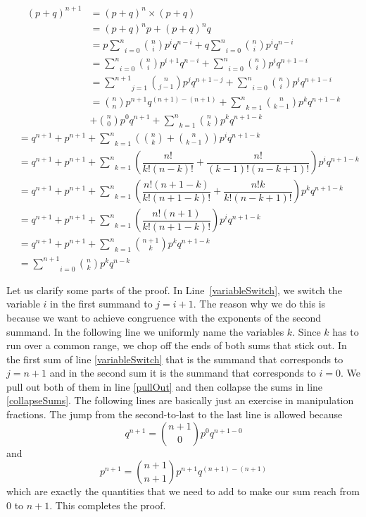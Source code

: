 \documentclass[a4paper,11pt,leqno]{report}
\begin{document}
\begin{align}
(p + q)^{n+1} &= (p + q)^{n} \times (p + q) \\
&= (p+q)^{n}p + (p+q)^{n}q \\
&= p\underset{i=0}{\overset{n}{\sum}} \binom{n}{i} p^{i}q^{n-i} + q\underset{i=0}{\overset{n}{\sum}} \binom{n}{i} p^{i}q^{n-i} \\
&= \underset{i=0}{\overset{n}{\sum}} \binom{n}{i} p^{i+1}q^{n-i} + \underset{i=0}{\overset{n}{\sum}} \binom{n}{i} p^{i}q^{n+1-i} \\
&= \underset{j=1}{\overset{n+1}{\sum}} \binom{n}{j-1} p^{j}q^{n+1-j} + \underset{i=0}{\overset{n}{\sum}} \binom{n}{i} p^{i}q^{n+1-i} \label{variableSwitch} \\
&= \binom{n}{n} p^{n+1}q^{(n+1)-(n+1)} + \underset{k=1}{\overset{n}{\sum}} \binom{n}{k-1} p^{k}q^{n+1-k} \label{pullOut} \\
&+ \binom{n}{0} p^{0}q^{n+1} + \underset{k=1}{\overset{n}{\sum}} \binom{n}{k} p^{k}q^{n+1-k} \nonumber \label{collapseSums}
\end{align}
\begin{align}
&= q^{n+1} + p^{n+1} + \underset{k=1}{\overset{n}{\sum}} \left(\binom{n}{k} + \binom{n}{k-1}\right) p^{i}q^{n+1-k} \\
&= q^{n+1} + p^{n+1} + \underset{k=1}{\overset{n}{\sum}} \left(\dfrac{n!}{k!(n-k)!} + \dfrac{n!}{(k-1)!(n-k+1)!}\right) p^{i}q^{n+1-k} \\
&= q^{n+1} + p^{n+1} + \underset{k=1}{\overset{n}{\sum}} \left(\dfrac{n!(n+1-k)}{k!(n+1-k)!} + \dfrac{n!k}{k!(n-k+1)!}\right) p^{k}q^{n+1-k} \\
&= q^{n+1} + p^{n+1} + \underset{k=1}{\overset{n}{\sum}} \left(\dfrac{n!(n+1)}{k!(n+1-k)!}\right) p^{i}q^{n+1-k} \\
&= q^{n+1} + p^{n+1} + \underset{k=1}{\overset{n}{\sum}} \binom{n+1}{k} p^{k}q^{n+1-k} \\
&= \underset{i=0}{\overset{n+1}{\sum}} \binom{n}{k} p^{k}q^{n-k}
\end{align}

Let us clarify some parts of the proof. In Line~\ref{variableSwitch}, we switch the variable $ i $ in the first summand to $ j = i+1 $. The
reason why we do this is because we want to achieve congruence with the exponents of the second summand. In the following line we 
uniformly name the variables $ k $. Since $ k $ has to run over a common range, we chop off the ends of both sums that stick out. In the first
sum of line \ref{variableSwitch} that is the summand that corresponds to $ j=n+1 $ and in the second sum it is the summand that corresponds
to $ i = 0 $. We pull out both of them in line \ref{pullOut} and then collapse the sums in line \ref{collapseSums}. The following lines 
are basically just an exercise in manipulation fractions. The jump from the second-to-last to the last line is allowed because
$$ q^{n+1} = \binom{n+1}{0}p^{0}q^{n+1-0} $$ and $$ p^{n+1} = \binom{n+1}{n+1}p^{n+1}q^{(n+1)-(n+1)} $$
which are exactly the quantities that we need to add to make our sum reach from $ 0 $ to $ n+1 $. This completes the proof.
\end{document}
